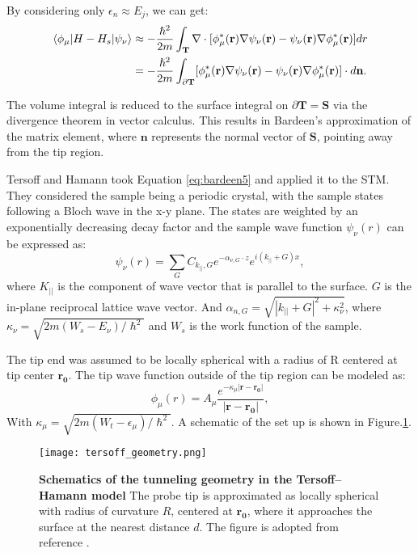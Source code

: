 By considering only $\epsilon_n \approx E_j$, we can get:
\begin{align}
	\label{eq:bardeen4}
	\braket{\phi_{\mu}|H-H_s|\psi_{\nu}} &\approx -\frac{\hslash^2}{2m}\int_\mathbf{T}\nabla \cdot [\phi_{\mu}^*(\mathbf{r})\nabla\psi_{\nu}(\mathbf{r})-\psi_{\nu}(\mathbf{r})\nabla\phi_{\mu}^*(\mathbf{r})]dr\\ \label{eq:bardeen5}
	& = -\frac{\hslash^2}{2m}\int_{\partial\mathbf{T}}[\phi_{\mu}^*(\mathbf{r})\nabla\psi_{\nu}(\mathbf{r})-\psi_{\nu}(\mathbf{r})\nabla\phi_{\mu}^*(\mathbf{r})]\cdot d\mathbf{n}.
\end{align}

The volume integral is reduced to the surface integral on $\partial \mathbf{T} = \mathbf{S}$ via the divergence theorem in vector calculus. This results in Bardeen's approximation of the matrix element, where $\mathbf{n}$ represents the normal vector of $\mathbf{S}$, pointing away from the tip region.  

Tersoff and Hamann took Equation \ref{eq:bardeen5} and applied it to the \ac{STM}. They considered the sample being a periodic crystal, with the sample states following a Bloch wave in the x-y plane. The states are weighted by an exponentially decreasing decay factor and the sample wave function $\psi_{\nu}(r)$ can be expressed as:
\begin{equation}
	\label{eq:sample_wavefunction}
	\psi_{\nu}(r) = \sum_G C_{k_{||},G} e^{-\alpha_{\nu,G}\cdot z }e^{i(k_{||}+G)x},
\end{equation}
where $K_{||}$ is the component of wave vector that is parallel to the surface. $G$ is the in-plane reciprocal lattice wave vector. And $\alpha_{n,G} = \sqrt{|k_{||}+G|^2 + \kappa_{\nu}^2}$, where $\kappa_{\nu} = \sqrt{2m(W_s - E_{\nu})/\hslash^2}$ and $W_s$ is the work function of the sample. 

The tip end was assumed to be locally spherical with a radius of R centered at tip center $\mathbf{r_0}$. The tip wave function outside of the tip region can be modeled as:
\begin{equation}
	\label{eq:tip_wavefunction}
	\phi_{\mu}(r) = A_{\mu} \frac{e^{-\kappa_{\mu} |\mathbf{r-r_0}|}}{|\mathbf{r-r_0}|},
\end{equation}
With $\kappa_{\mu} = \sqrt{2m(W_t-\epsilon_{\mu})/\hslash^2}$. A schematic of the set up is shown in Figure.\ref{fig:tersoff}. 
\begin{figure}
	\centering
	\texttt{[image: tersoff\_geometry.png]}
	\caption[\textbf{Schematics of the tunneling geometry in the Tersoff–Hamann model}]{\textbf{Schematics of the tunneling geometry in the Tersoff–Hamann model} The probe tip is approximated as locally spherical with radius of curvature $R$, centered at $\mathbf{r_0}$, where it approaches the surface at the nearest distance $d$. The figure is adopted from reference \cite{tersoffTheoryScanningTunneling1985}.}
	\label{fig:tersoff}
\end{figure}

